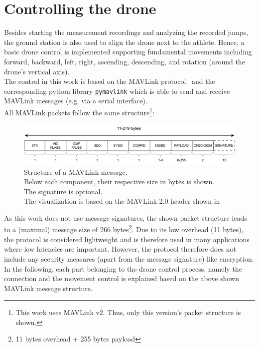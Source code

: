 \section{Controlling the drone}\label{sec:4_drone_ctrl}
Besides starting the measurement recordings and analyzing the recorded jumps,
the ground station is also used to align the drone next to the athlete.
Hence, a basic drone control is implemented supporting fundamental movements
including forward, backward, left, right, ascending, descending, and rotation
(around the drone's vertical axis).\\
The control in this work is based on the MAVLink
protocol~\cite{koubaaMicroAirVehicle2019} and the
corresponding python library \texttt{pymavlink} which is able to send and
receive MAVLink messages (e.g. via a serial interface).\\
All MAVLink packets follow the same structure\footnote{This work uses MAVLink
v2. Thus, only this version's packet structure is shown.}:
\begin{figure}[!h]
    \centering
    \includegraphics[scale=0.7]{mavlink_v2.pdf}
    \caption[Structure of a MAVLink message]{Structure of a MAVLink message.\\
    Below each component, their respective size in bytes is shown.\\
    The signature is optional.\\
    The visualization is based on the MAVLink 2.0 header shown
    in~\cite{koubaaMicroAirVehicle2019}}
    \label{fig:4_mavlink_message}
\end{figure}
\FloatBarrier
\noindent As this work does not use message signatures, the shown packet
structure leads to a (maximal) message size of 266 bytes\footnote{11 bytes
overhead + 255 bytes payload}.
Due to its low overhead (11 bytes), the protocol is considered lightweight and
is therefore used in many applications where low latencies are important.
However, the protocol therefore does not include any security measures (apart
from the message signature) like encryption.\\
In the following, each part belonging to the drone control process, namely
the connection and the movement control is explained based on the above shown
MAVLink message structure.

